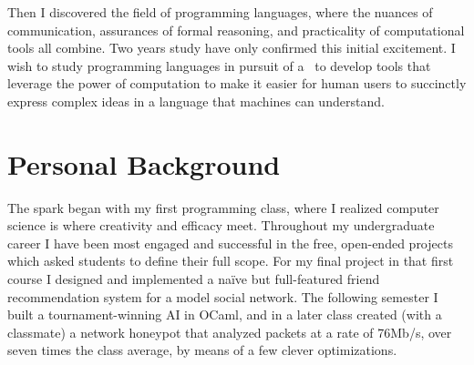\documentclass{article}
\begin{document}

Then I discovered the field of programming languages, where the nuances of communication, assurances of formal reasoning, and practicality of computational tools all combine.
Two years study have only confirmed this initial excitement.
I wish to study programming languages in pursuit of a \phd~to develop tools that leverage the power of computation to make it easier for human users to succinctly express complex ideas in a language that machines can understand.

\section{Personal Background}

The spark began with my first programming class, where I realized computer science is where creativity and efficacy meet. 
Throughout my undergraduate career I have been most engaged and successful in the free, open-ended projects which asked students to define their full scope.
For my final project in that first course I designed and implemented a na\"ive but full-featured friend recommendation system for a model social network.
The following semester I built a tournament-winning AI in OCaml, and in a later class created (with a classmate) a network honeypot that analyzed packets at a rate of 76Mb/s, over seven times the class average, by means of a few clever optimizations.
\end{document}
